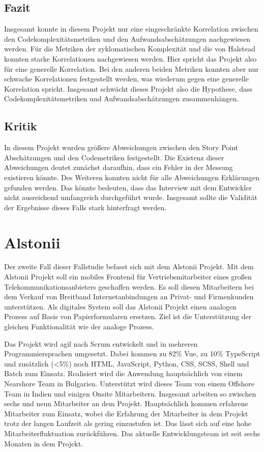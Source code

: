 \subsection{Fazit}\label{ingrid-fazit}

Insgesamt konnte in diesem Projekt nur eine eingeschränkte Korrelation
zwischen den Codekomplexitätsmetriken und den Aufwandsabschätzungen
nachgewiesen werden. Für die Metriken der zyklomatischen Komplexität und
die von Halstead konnten starke Korrelationen nachgewiesen werden. Hier
spricht das Projekt also für eine generelle Korrelation. Bei den anderen
beiden Metriken konnten aber nur schwache Korrelationen festgestellt
werden, was wiederum gegen eine generelle Korrelation spricht. Insgesamt
schwächt dieses Projekt also die Hypothese, dass
Codekomplexitätsmetriken und Aufwandsabschätzungen zusammenhängen.

\subsection{Kritik}\label{ingrid-kritik}

In diesem Projekt wurden größere Abweichungen zwischen den Story Point
Abschätzungen und den Codemetriken festgestellt. Die Existenz dieser
Abweichungen deutet zunächst daraufhin, dass ein Fehler in der Messung
existieren könnte. Des Weiteren konnten nicht für alle Abweichungen
Erklärungen gefunden werden. Das könnte bedeuten, dass das Interview mit
dem Entwickler nicht ausreichend umfangreich durchgeführt wurde.
Insgesamt sollte die Validität der Ergebnisse dieses Falls stark
hinterfragt werden.

\section{Alstonii}\label{alstonii}

Der zweite Fall dieser Fallstudie befasst sich mit dem Alstonii
Projekt. Mit dem Alstonii Projekt soll ein mobiles Frontend für
Vertriebsmitarbeiter eines großen Telekommunikationsanbieters geschaffen
werden. Es soll diesen Mitarbeitern bei dem Verkauf von Breitband
Internetanbindungen an Privat- und Firmenkunden unterstützen. Als
digitales System soll das Alstonii Projekt einen analogen Prozess auf Basis
von Papierformularen ersetzen. Ziel ist die Unterstützung der gleichen
Funktionalität wie der analoge Prozess.

Das Projekt wird agil nach Scrum entwickelt und in mehreren
Programmiersprachen umgesetzt. Dabei kommen zu 82\% Vue, zu 10\%
TypeScript und zusätzlich (\textless5\%) noch \ac{HTML}, JavaScript, Python,
CSS, SCSS, Shell und Batch zum Einsatz. Realisiert
wird die Anwendung hauptsächlich von einem Nearshore Team in Bulgarien.
Unterstützt wird dieses Team von einem Offshore Team in Indien und
einigen Onsite Mitarbeitern. Insgesamt arbeiten so zwischen sechs und
neun Mitarbeiter an dem Projekt. Hauptsächlich kommen erfahrene
Mitarbeiter zum Einsatz, wobei die Erfahrung der Mitarbeiter in dem
Projekt trotz der langen Laufzeit als gering einzustufen ist. Das lässt
sich auf eine hohe Mitarbeiterfluktuation zurückführen. Das aktuelle
Entwicklungsteam ist seit sechs Monaten in dem Projekt.

